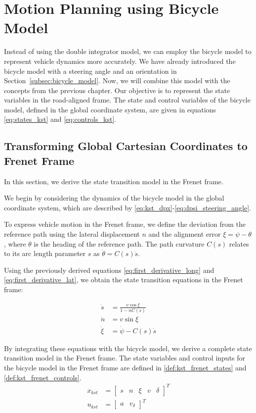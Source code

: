 \section{Motion Planning using Bicycle Model} \label{sec:motion_planning_using_bicylce}
Instead of using the double integrator model, we can employ the bicycle model to represent vehicle dynamics more accurately.
We have already introduced the bicycle model with a steering angle and an orientation in Section~\ref{subsec:bicycle_model}.
Now, we will combine this model with the concepts from the previous chapter.
Our objective is to represent the state variables in the road-aligned frame.
The state and control variables of the bicycle model, defined in the global coordinate system, are given in equations \eqref{eq:states_kst} and
\eqref{eq:controls_kst}.

\subsection{Transforming Global Cartesian Coordinates to Frenet Frame} \label{subsec:bicycle_conversion_of_cartesian_to_frenet}

In this section, we derive the state transition model in the Frenet frame.

We begin by considering the dynamics of the bicycle model in the global coordinate system, which are described by
\eqref{eq:kst_dpx}-\eqref{eq:dpsi_steering_angle}.

To express vehicle motion in the Frenet frame, we define the deviation from the reference path using the lateral displacement $n$ and the alignment
error $\xi = \psi - \theta$, where $\theta$ is the heading of the reference path.
The path curvature $C(s)$ relates to its arc length parameter $s$ as $\dot{\theta} = C(s) \dot{s}$.

Using the previously derived equations \eqref{eq:first_derivative_long} and \eqref{eq:first_derivative_lat}, we obtain the state transition equations in the Frenet frame:

\begin{align} \dot{s} &= \frac{v\cos\xi}{1 - nC(s)} \\ \dot{n} &= v\sin\xi \\ \dot{\xi} &= \dot{\psi} - C(s)\dot{s} \end{align}

By integrating these equations with the bicycle model, we derive a complete state transition model in the Frenet frame.
The state variables and control inputs for the bicycle model in the Frenet frame are defined in \eqref{def:kst_frenet_states} and
\eqref{def:kst_frenet_controls}.
\begin{align}
	x_{kst} & = \begin{bmatrix}
		            s & n & \xi & v & \delta
	            \end{bmatrix}^T
	\label{def:kst_frenet_states}        \\[10pt]
	u_{kst} & = \begin{bmatrix}
		            a & v_\delta
	            \end{bmatrix}^T
	\label{def:kst_frenet_controls}
\end{align}


